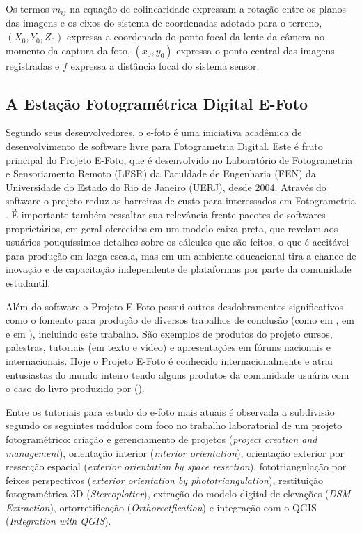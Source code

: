 Os termos $m_{ij}$ na equação de colinearidade expressam a rotação entre os planos das imagens e os eixos do sistema de coordenadas adotado para o terreno, $(X_0, Y_0, Z_0)$ expressa a coordenada do ponto focal da lente da câmera no momento da captura da foto, $(x_0, y_0)$ expressa o ponto central das imagens registradas e $f$ expressa a distância focal do sistema sensor.


\subsection{A Estação Fotogramétrica Digital E-Foto}

Segundo seus desenvolvedores, o e-foto é uma iniciativa acadêmica de desenvolvimento de software livre para Fotogrametria Digital. Este é fruto principal do Projeto E-Foto, que é desenvolvido no Laboratório de Fotogrametria e Sensoriamento Remoto (LFSR) da Faculdade de Engenharia (FEN) da Universidade do Estado do Rio de Janeiro (UERJ), desde 2004. Através do software o projeto reduz as barreiras de custo para interessados em Fotogrametria \cite{EFotowebsite}. É importante também ressaltar sua relevância frente pacotes de softwares proprietários, em geral oferecidos em um modelo caixa preta, que revelam aos usuários pouquíssimos detalhes sobre os cálculos que são feitos, o que é aceitável para produção em larga escala, mas em um ambiente educacional tira a chance de inovação e de capacitação independente de plataformas por parte da comunidade estudantil.

Além do software o Projeto E-Foto possui outros desdobramentos significativos como o fomento para produção de diversos trabalhos de conclusão (como  em \citeyear{correa2011},  em \citeyear{jonas2012} e  em \citeyear{regal2013}), incluindo este trabalho. São exemplos de produtos do projeto cursos, palestras, tutoriais (em texto e vídeo) e apresentações em fóruns nacionais e internacionais. Hoje o Projeto E-Foto é conhecido internacionalmente e atrai entusiastas do mundo inteiro tendo alguns produtos da comunidade usuária com o caso do livro produzido por  (\citeyear{Martin_Vermeer2018}).

Entre os tutoriais para estudo do e-foto mais atuais é observada a subdivisão segundo os seguintes módulos com foco no trabalho laboratorial de um projeto fotogramétrico:
criação e gerenciamento de projetos (\textit{project creation and management}), 
orientação interior (\textit{interior orientation}),
orientação exterior por ressecção espacial (\textit{exterior orientation by space resection}),
fototriangulação por feixes perspectivos (\textit{exterior orientation by phototriangulation}),
restituição fotogramétrica 3D (\textit{Stereoplotter}),
extração do modelo digital de elevações (\textit{DSM Extraction}),
ortorretificação (\textit{Orthorectfication}) e
integração com o QGIS (\textit{Integration with QGIS}). 

